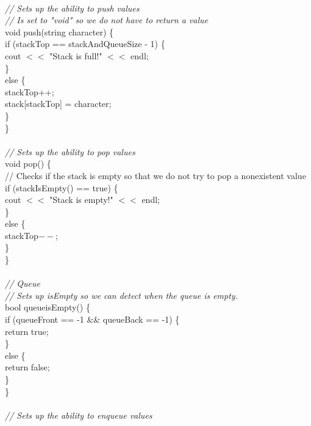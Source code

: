 \documentclass{article}
\begin{document}
\begin {linenumbers}
\\
\textit{// Sets up the ability to push values\\
// Is set to "void" so we do not have to return a value\\}
void push(string character) \{\\
    \indent if (stackTop == stackAndQueueSize - 1) \{\\
        \indent \indent cout $<<$ "Stack is full!" $<<$ endl;\\
    \indent \}\\
    \indent else \{\\
        \indent \indent stackTop++;\\
        \indent \indent stack[stackTop] = character;\\
    \indent \}\\
\}\\
\\
\textit{// Sets up the ability to pop values\\}
void pop() \{\\
    \indent // Checks if the stack is empty so that we do not try to pop a \indent nonexistent value\\
    \indent if (stackIsEmpty() == true) \{\\
        \indent \indent cout $<<$ "Stack is empty!" $<<$ endl;\\
    \indent \}\\
    \indent else \{\\
        \indent \indent stackTop$--$;\\
    \indent \}\\
\}\\
\\
\textit{// Queue\\
// Sets up isEmpty so we can detect when the queue is empty.\\}
bool queueisEmpty() \{\\
    \indent if (queueFront == -1 \&\& queueBack == -1) \{\\
        \indent \indent return true;\\
    \indent \}\\
    \indent else \{\\
        \indent \indent return false;\\
    \indent \}\\
\}\\
\\
\textit{// Sets up the ability to enqueue values\\}

\end{linenumbers}
\end{document}
